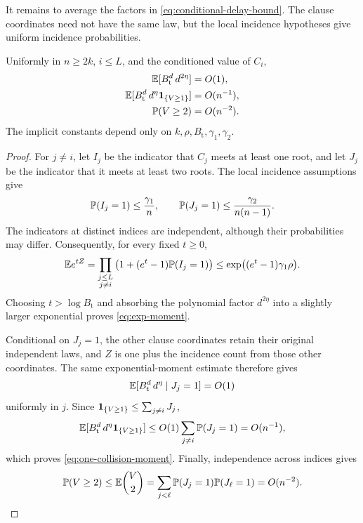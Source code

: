 It remains to average the factors in
\eqref{eq:conditional-delay-bound}.  The clause coordinates need not have
the same law, but the local incidence hypotheses give uniform incidence
probabilities.

\begin{lemma}
\label{lem:incidence-moments}
Uniformly in $n\ge2k$, $i\le L$, and the conditioned value of $C_i$,
\begin{align}
    \mathbb E[B_{\mathrm{t}}^d\,d^{2\eta}]&=O(1),
    \label{eq:exp-moment}\\
    \mathbb E[B_{\mathrm{t}}^d\,d^\eta\mathbf 1_{\{V\ge1\}}]
      &=O(n^{-1}),
    \label{eq:one-collision-moment}\\
    \mathbb P(V\ge2)&=O(n^{-2}).
    \label{eq:two-collision-prob}
\end{align}
The implicit constants depend only on
$k,\rho,B_{\mathrm{t}},\gamma_1,\gamma_2$.
\end{lemma}

\begin{proof}
For $j\ne i$, let $I_j$ be the indicator that $C_j$ meets at least one
root, and let $J_j$ be the indicator that it meets at least two roots.
The local incidence assumptions give
\begin{equation}
    \mathbb P(I_j=1)\le \frac{\gamma_1}{n},
    \qquad
    \mathbb P(J_j=1)\le \frac{\gamma_2}{n(n-1)}.
    \label{eq:incidence-probabilities}
\end{equation}
The indicators at distinct indices are independent, although their
probabilities may differ.  Consequently, for every fixed $t\ge0$,
\[
    \mathbb E e^{tZ}
    =\prod_{\substack{j\le L\\j\ne i}}
       \left(1+(e^t-1)\mathbb P(I_j=1)\right)
    \le
    \exp\bigl((e^t-1)\gamma_1\rho\bigr).
\]
Choosing $t>\log B_{\mathrm{t}}$ and absorbing the polynomial factor
$d^{2\eta}$ into a slightly larger exponential proves
\eqref{eq:exp-moment}.

Conditional on $J_j=1$, the other clause coordinates retain their original
independent laws, and $Z$ is one plus the incidence count from those other
coordinates.  The same exponential-moment estimate therefore gives
\[
    \mathbb E[B_{\mathrm{t}}^d\,d^\eta\mid J_j=1]=O(1)
\]
uniformly in $j$.  Since
$\mathbf 1_{\{V\ge1\}}\le\sum_{j\ne i}J_j$,
\[
    \mathbb E[B_{\mathrm{t}}^d\,d^\eta\mathbf 1_{\{V\ge1\}}]
    \le
    O(1)\sum_{j\ne i}\mathbb P(J_j=1)
    =O(n^{-1}),
\]
which proves \eqref{eq:one-collision-moment}.  Finally, independence
across indices gives
\[
    \mathbb P(V\ge2)
    \le \mathbb E\binom V2
    =\sum_{j<\ell}\mathbb P(J_j=1)\mathbb P(J_\ell=1)
    =O(n^{-2}).
\]
\end{proof}

